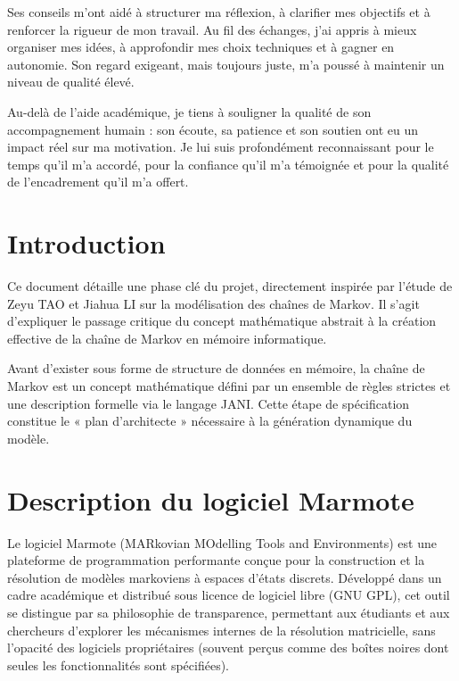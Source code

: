 \documentclass[14pt, a4paper]{extarticle}
\begin{document}
Ses conseils m’ont aidé à structurer ma réflexion, à clarifier mes objectifs et à renforcer la rigueur de mon travail. Au fil des échanges, j’ai appris à mieux organiser mes idées, à approfondir mes choix techniques et à gagner en autonomie. Son regard exigeant, mais toujours juste, m’a poussé à maintenir un niveau de qualité élevé.

Au-delà de l’aide académique, je tiens à souligner la qualité de son accompagnement humain : son écoute, sa patience et son soutien ont eu un impact réel sur ma motivation. Je lui suis profondément reconnaissant pour le temps qu’il m’a accordé, pour la confiance qu’il m’a témoignée et pour la qualité de l’encadrement qu’il m’a offert.

\clearpage
\tableofcontents
\clearpage



\section{Introduction}
Ce document détaille une phase clé du projet, directement inspirée par l'étude de Zeyu TAO et Jiahua LI sur la modélisation des chaînes de Markov. Il s'agit d'expliquer le passage critique du concept mathématique abstrait à la création effective de la chaîne de Markov en mémoire informatique.

Avant d'exister sous forme de structure de données en mémoire, la chaîne de Markov est un concept mathématique défini par un ensemble de règles strictes et une description formelle via le langage JANI. Cette étape de spécification constitue le « plan d'architecte » nécessaire à la génération dynamique du modèle.

\section{Description du logiciel Marmote}

Le logiciel Marmote (MARkovian MOdelling Tools and Environments) est une plateforme de programmation performante conçue pour la construction et la résolution de modèles markoviens à espaces d'états discrets. Développé dans un cadre académique et distribué sous licence de logiciel libre (GNU GPL), cet outil se distingue par sa philosophie de transparence, permettant aux étudiants et aux chercheurs d'explorer les mécanismes internes de la résolution matricielle, sans l'opacité des logiciels propriétaires (souvent perçus comme des boîtes noires dont seules les fonctionnalités sont spécifiées).
\end{document}
